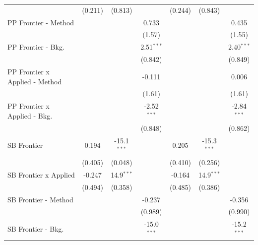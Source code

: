 \begin{tabular}{lcccccc}
                                  & (0.211)        & (0.813)       &               & (0.244)        & (0.843)       &   \\   
   PP Frontier - Method           &                &               & 0.733         &                &               & 0.435\\   
                                  &                &               & (1.57)        &                &               & (1.55)\\   
   PP Frontier - Bkg.             &                &               & 2.51$^{***}$  &                &               & 2.40$^{***}$\\   
                                  &                &               & (0.842)       &                &               & (0.849)\\   
   PP Frontier x Applied - Method &                &               & -0.111        &                &               & 0.006\\   
                                  &                &               & (1.61)        &                &               & (1.61)\\   
   PP Frontier x Applied - Bkg.   &                &               & -2.52$^{***}$ &                &               & -2.84$^{***}$\\   
                                  &                &               & (0.848)       &                &               & (0.862)\\   
   SB Frontier                    & 0.194          & -15.1$^{***}$ &               & 0.205          & -15.3$^{***}$ &   \\   
                                  & (0.405)        & (0.048)       &               & (0.410)        & (0.256)       &   \\   
   SB Frontier x Applied          & -0.247         & 14.9$^{***}$  &               & -0.164         & 14.9$^{***}$  &   \\   
                                  & (0.494)        & (0.358)       &               & (0.485)        & (0.386)       &   \\   
   SB Frontier - Method           &                &               & -0.237        &                &               & -0.356\\   
                                  &                &               & (0.989)       &                &               & (0.990)\\   
   SB Frontier - Bkg.             &                &               & -15.0$^{***}$ &                &               & -15.2$^{***}$\\   

\end{tabular}
